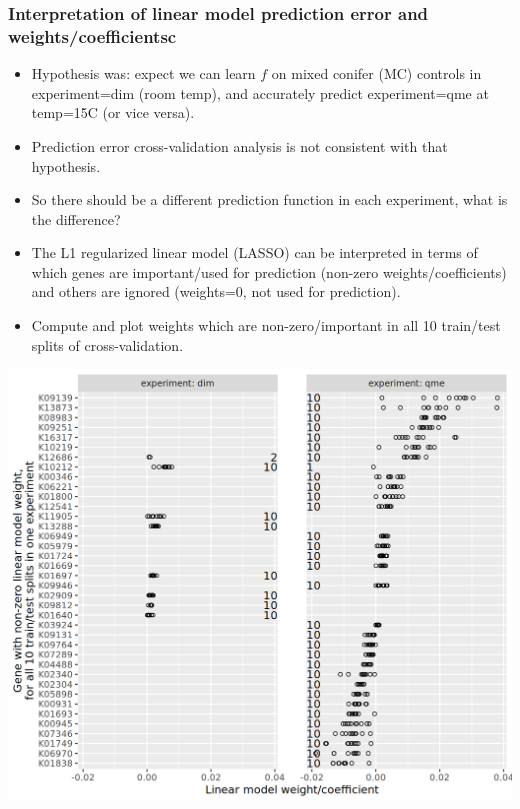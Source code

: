 \documentclass{beamer}
\begin{document}
\begin{frame}
    \frametitle{Interpretation of linear model prediction error and weights/coefficientsc}
    \begin{itemize}
    \item Hypothesis was: expect we can learn $f$ on mixed conifer (MC) controls in experiment=dim (room temp), and accurately predict experiment=qme at temp=15C (or vice versa). 
    \item Prediction error cross-validation analysis is not consistent with that hypothesis.
    \item So there should be a different prediction function in each
      experiment, what is the difference?
    \item The L1 regularized linear model (LASSO) can be interpreted
      in terms of which genes are important/used for prediction
      (non-zero weights/coefficients) and others are ignored
      (weights=0, not used for prediction).
    \item Compute and plot weights which are non-zero/important in all 10
      train/test splits of cross-validation.
    \end{itemize}
\end{frame}

\begin{frame}
  \includegraphics[width=\textwidth]{2024-01-09-qsip_pc2_all_new-controls.between.experiments.weights.png}
\end{frame}
\end{document}
